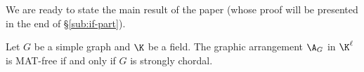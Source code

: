  We are ready to state the main result of the paper (whose proof will be presented in the end of \S \ref{sub:if-part}).
 \begin{theorem}
\label{thm:MAT-free-strong-chordal}
Let $G$ be a simple graph and $\K$ be a field. 
The graphic arrangement $\A_G$ in $\K^\ell$ is MAT-free if and only if $G$ is strongly chordal.
\end{theorem}
